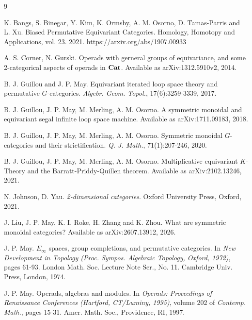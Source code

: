 \documentclass{article}
\begin{document}
\begin{thebibliography}{9}

K. Bangs, S. Binegar, Y. Kim, K. Ormsby, A. M. Osorno, D. Tamas-Parris and L. Xu.
Biased Permutative Equivariant Categories.
Homology, Homotopy and Applications, vol. 23.
2021.
https://arxiv.org/abs/1907.00933


A. S. Corner, N. Gurski.
Operads with gerneral groups of equivariance, and some 2-categorical aspects of operads in $\mathbf{Cat}$.
Available as arXiv:1312.5910v2, 2014.

B. J. Guillou and J. P. May.
Equivariant iterated loop space theory and permutative $G$-categories.
\emph{Algebr. Geom. Topol.}, 17(6):3259-3339, 2017.

B. J. Guillou, J. P. May, M. Merling, A. M. Osorno.
A symmetric monoidal and equivariant segal infinite loop space machine.
Available as arXiv:1711.09183, 2018.

B. J. Guillou, J. P. May, M. Merling, A. M. Osorno.
Symmetric monoidal $G$-categories and their strictification.
\emph{Q. J. Math.}, 71(1):207-246, 2020.

B. J. Guillou, J. P. May, M. Merling, A. M. Osorno.
Multiplicative equivariant $K$-Theory and the Barratt-Priddy-Quillen theorem.
Available as arXiv:2102.13246, 2021.

N. Johnson, D. Yau.
\emph{2-dimensional categories}.
Oxford University Press, Oxford, 2021.


J. Liu, J. P. May, K. I. Roke, H. Zhang and K. Zhou.
What are symmetric monoidal categories?
Available as arXiv:2607.13912, 2026.

J. P. May. $E_\infty$ spaces, group completions, and permutative categories. In \emph{New Development in Topology (Proc. Sympos. Algebraic Topology, Oxford, 1972)}, pages 61-93. London Math. Soc. Lecture Note Ser., No. 11. Cambridge Univ. Press, London, 1974.

J. P. May. Operads, algebras and modules. In \emph{Operads: Proceedings of Renaissance Conferences (Hartford, CT/Luminy, 1995)}, volume 202 of \emph{Contemp. Math.}, pages 15-31. Amer. Math. Soc., Providence, RI, 1997. 


\end{thebibliography}
\end{document}
